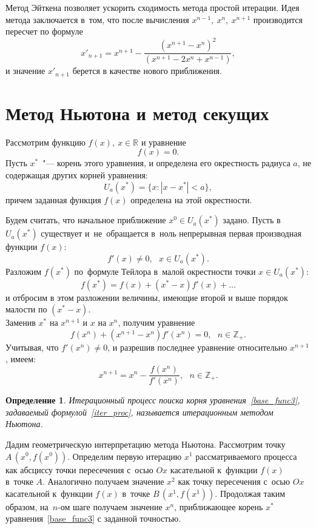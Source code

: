 \documentclass[11pt,a4paper,twoside,listtotoc,bibtotoc]{report}
\numberwithin{equation}{section}
\newtheorem*{definition}{Определение}
\theoremstyle{definition}
\theoremstyle{plain}
\begin{document}
Метод Эйткена позволяет ускорить сходимость метода простой итерации.
Идея метода заключается в~том, что после вычисления
$x^{n-1},~x^n,~x^{n+1}$ производится пересчет по формуле
%
$$
    x'_{n+1}=x^{n+1} - \frac{(x^{n+1} - x^n)^2}{(x^{n+1} - 2x^n + x^{n-1})},
$$
%
и значение $x'_{n+1}$ берется в качестве нового приближения.
%
\section{Метод Ньютона и метод секущих}
%
\label{Newton_method}
%
Рассмотрим функцию $f(x), ~x\in \mathbb{R}$ и уравнение
%
\begin{equation}
%
    \label{base_func3}
    f(x)=0.
%
\end{equation}
%
Пусть $x^*$~"--- корень этого уравнения, и определена его
окрестность радиуса $a$, не содержащая других корней уравнения:
%
$$
    U_a(x^*)=\{x:|x-x^*| < a\},
$$
%
причем заданная функция $f(x)$ определена на этой окрестности.

Будем считать, что начальное приближение $x^0 \in U_a(x^*)$ задано.
Пусть в $U_a(x^*)$ существует и~не~обращается в~ноль непрерывная
первая производная функции $f(x)$:
%
$$
    f'(x) \neq 0,~~~x\in U_a(x^*).
$$
%
Разложим $f(x^*)$ по~формуле Тейлора в~малой окрестности точки $x\in U_a(x^*)$:
%
$$
    f(x^*) =  f(x) + (x^* - x)f'(x) + \dots
$$
%
и отбросим в этом разложении величины, имеющие второй и выше порядок малости
по $(x^* - x)$.\\
Заменив $x^*$ на $x^{n+1}$ и $x$ на $x^n$, получим уравнение
%
$$
    f(x^n) + (x^{n + 1} - x^n)f'(x^n) = 0,~~~n\in \mathbb{Z}_+.
$$
%
Учитывая, что $f'(x^n) \neq 0$, и разрешив последнее уравнение относительно
$x^{n+1}$, имеем:
%
    \begin{equation}
        \label{iter_proc}
        x^{n + 1} = x^n - \frac{f(x^n)}{f'(x^n)},~~~n \in \mathbb{Z}_+.
    \end{equation}
%
\begin{definition}
%
    Итерационный процесс поиска корня уравнения~\eqref{base_func3},
    задаваемый формулой~\eqref{iter_proc},
    называется итерационным методом Ньютона.
%
\end{definition}
%

Дадим геометрическую интерпретацию метода Ньютона. Рассмотрим точку
$A\,(x^0, f(x^0))$. Определим первую итерацию $x^1$ рассматриваемого процесса
как абсциссу точки пересечения с~осью $Ox$ касательной к~функции $f(x)$
в~точке $A$. Аналогично получаем значение $x^2$ как точку пересечения
с~осью $Ox$ касательной к~функции $f(x)$ в~точке $B\,(x^1, f(x^1))$.  Продолжая
таким образом, на~$n$-ом шаге получаем значение $x^n$, приближающее
корень $x^*$ уравнения~\eqref{base_func3} с заданной точностью.
\end{document}
